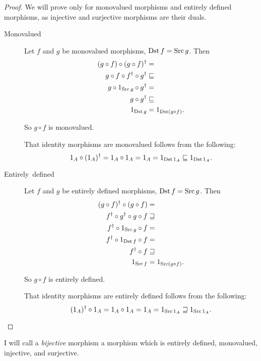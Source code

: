 \begin{proof}
We will prove only for monovalued morphisms and entirely defined morphisms,
as injective and surjective morphisms are their duals.
\begin{description}
\item [{Monovalued}] Let $f$ and $g$ be monovalued morphisms, $\operatorname{Dst} f=\operatorname{Src} g$.
Then
\begin{align*}
(g\circ f)\circ(g\circ f)^{\dagger} & =\\
g\circ f\circ f^{\dagger}\circ g^{\dagger} & \sqsubseteq\\
g\circ1_{\operatorname{Src} g}\circ g^{\dagger} & =\\
g\circ g^{\dagger} & \sqsubseteq\\
1_{\operatorname{Dst} g}&=1_{\operatorname{Dst}(g\circ f)}.
\end{align*}



So $g\circ f$ is monovalued.


That identity morphisms are monovalued follows from the following:
\[
1_{A}\circ(1_{A})^{\dagger}=1_{A}\circ1_{A}=1_{A}=1_{\operatorname{Dst}1_{A}}\sqsubseteq1_{\operatorname{Dst}1_{A}}.
\]


\item [{Entirely~defined}] Let $f$ and $g$ be entirely defined morphisms,
$\operatorname{Dst} f=\operatorname{Src} g$. Then
\begin{align*}
(g\circ f)^{\dagger}\circ(g\circ f) & =\\
f^{\dagger}\circ g^{\dagger}\circ g\circ f & \sqsupseteq\\
f^{\dagger}\circ1_{\operatorname{Src} g}\circ f & =\\
f^{\dagger}\circ1_{\operatorname{Dst} f}\circ f & =\\
f^{\dagger}\circ f & \sqsupseteq\\
1_{\operatorname{Src} f}&=1_{\operatorname{Src}(g\circ f)}.
\end{align*}



So $g\circ f$ is entirely defined.


That identity morphisms are entirely defined follows from the following:
\[
(1_{A})^{\dagger}\circ1_{A}=1_{A}\circ1_{A}=1_{A}=1_{\operatorname{Src}1_{A}}\sqsupseteq1_{\operatorname{Src}1_{A}}.
\]


\end{description}
\end{proof}
\begin{defn}
I will call a \emph{bijective} morphism
a morphism which is entirely defined, monovalued, injective, and surjective.\end{defn}
